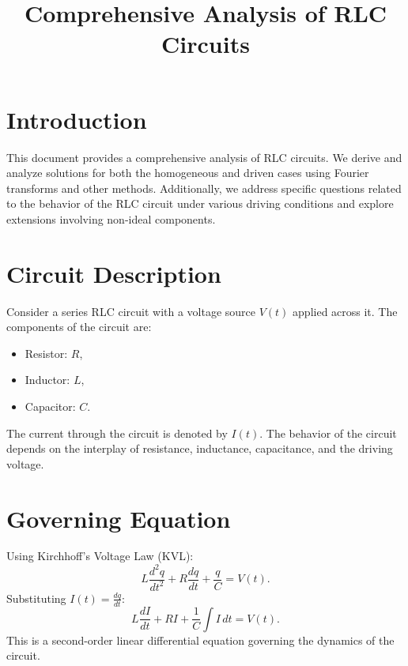 \documentclass[a4paper,11pt]{article}
\begin{document}
\title{Comprehensive Analysis of RLC Circuits}
\author{}
\date{}
\maketitle

\section*{Introduction}
This document provides a comprehensive analysis of RLC circuits. We derive and analyze solutions for both the homogeneous and driven cases using Fourier transforms and other methods. Additionally, we address specific questions related to the behavior of the RLC circuit under various driving conditions and explore extensions involving non-ideal components.

\section*{Circuit Description}
Consider a series RLC circuit with a voltage source \(V(t)\) applied across it. The components of the circuit are:
\begin{itemize}
    \item Resistor: \(R\),
    \item Inductor: \(L\),
    \item Capacitor: \(C\).
\end{itemize}

The current through the circuit is denoted by \(I(t)\). The behavior of the circuit depends on the interplay of resistance, inductance, capacitance, and the driving voltage.

\section*{Governing Equation}
Using Kirchhoff's Voltage Law (KVL):
\[
L \frac{d^2q}{dt^2} + R \frac{dq}{dt} + \frac{q}{C} = V(t).
\]
Substituting \(I(t) = \frac{dq}{dt}\):
\[
L \frac{dI}{dt} + R I + \frac{1}{C} \int I \, dt = V(t).
\]
This is a second-order linear differential equation governing the dynamics of the circuit.
\end{document}
